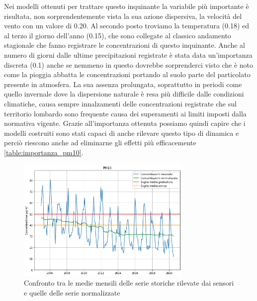 Nei modelli ottenuti per trattare questo inquinante la variabile più importante è risultata, non sorprendentemente vista la sua azione dispersiva, la velocità del vento con un valore di 0.20. Al secondo posto troviamo la temperatura (0.18) ed al terzo il giorno dell'anno (0.15), che sono collegate al classico andamento stagionale che fanno registrare le concentrazioni di questo inquinante. Anche al numero di giorni dalle ultime precipitazioni registrate è stata data un'importanza discreta (0.1) anche se nemmeno in questo dovrebbe sorprenderci visto che è noto come la pioggia abbatta le concentrazioni portando al suolo parte del particolato presente in atmosfera. La sua assenza prolungata, soprattutto in periodi come quello invernale dove la dispersione naturale è resa più difficile dalle condizioni climatiche, causa sempre innalzamenti delle concentrazioni registrate che sul territorio lombardo sono frequente causa dei superamenti ai limiti imposti dalla normativa vigente. Grazie all'importanza ottenuta possiamo quindi capire che i modelli costruiti sono stati capaci di anche rilevare questo tipo di dinamica e perciò riescono anche ad eliminarne gli effetti più efficacemente \ref{table:importanza_pm10}.

\begin{figure}[h]
\centering
\includegraphics[width=0.75\textwidth]{pm10_medie_mensili}
\caption{Confronto tra le medie mensili delle serie storiche rilevate dai sensori e quelle delle serie normalizzate}
\label{fig:pm10_medie_mensili}
\end{figure}


